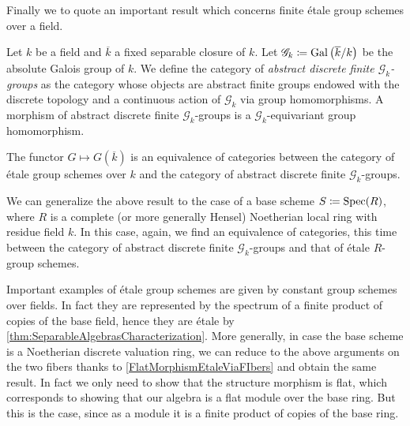 \noindent
Finally we to quote an important result which
concerns finite étale group schemes over a field.
\begin{defn}
	Let $k$ be a field and $\overline{k}$ a fixed separable closure of $k$.
	Let $\mathscr{G}_k \coloneqq \operatorname{Gal}\left( \overline{k} / k \right)$ be the
	absolute Galois group of $k$.
	We define the category of \emph{abstract discrete finite $\mathscr{G}_k$-groups} as the category
	whose objects are abstract finite groups endowed with the discrete topology and
	a continuous action of $\mathscr{G}_k$ via group homomorphisms.
	A morphism of abstract discrete finite $\mathscr{G}_k$-groups 
	is a $\mathscr{G}_k$-equivariant group homomorphism.
\end{defn}


\begin{thm}\label{CharacterizationEtaleGroupSchemesK}
	The functor $G \mapsto G(\overline{k})$ is an equivalence of categories
	between the category of étale group schemes over $k$ and the
	category of abstract discrete finite $\mathscr{G}_k$-groups.
\end{thm}


\begin{rem}
	We can generalize the above result to the case of a base scheme
	\(S \coloneqq \operatorname{Spec}(R)\), where \(R\) is a complete (or more generally
	Hensel) Noetherian local ring with residue field \(k\).
	In this case, again, we find an equivalence of categories,
	this time between the category of abstract discrete finite \(\mathscr{G}_k\)-groups
	and that of étale \(R\)-group schemes.
\end{rem}


\begin{ex}[]\label{EtaleConstantGroupScheme}
	Important examples of étale group schemes are given by
	constant group schemes over fields.
	In fact they are represented by the spectrum of a
	finite product of copies of the base field, hence they are étale
	by \cref{thm:SeparableAlgebrasCharacterization}.
	More generally, in case the base scheme is a Noetherian discrete valuation
	ring, we can reduce to the above arguments on the two fibers 
	thanks to \cref{FlatMorphismEtaleViaFIbers} and obtain the same result.
	In fact we only need to show that the structure morphism is flat,
	which corresponds to showing that our algebra is a flat module over the 
	base ring.
	But this is the case, since as a module it is a finite product of copies
	of the base ring.
\end{ex}



